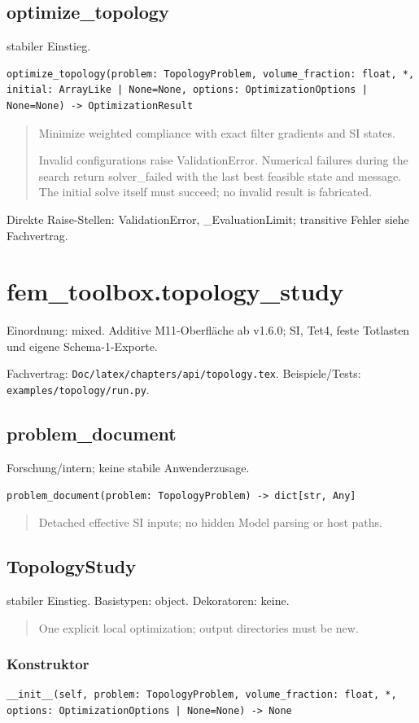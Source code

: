 \subsection{optimize\_topology}
stabiler Einstieg.
\begin{lstlisting}
optimize_topology(problem: TopologyProblem, volume_fraction: float, *, initial: ArrayLike | None=None, options: OptimizationOptions | None=None) -> OptimizationResult
\end{lstlisting}
\begin{quote}
Minimize weighted compliance with exact filter gradients and SI states.\par Invalid configurations raise ValidationError. Numerical failures during the search return solver\_failed with the last best feasible state and message. The initial solve itself must succeed; no invalid result is fabricated.
\end{quote}
Direkte Raise-Stellen: ValidationError, \_EvaluationLimit; transitive Fehler siehe Fachvertrag.
\section{fem\_toolbox.topology\_study}
Einordnung: mixed. Additive M11-Oberfläche ab v1.6.0; SI, Tet4, feste Totlasten und eigene Schema-1-Exporte.
\par Fachvertrag: \nolinkurl{Doc/latex/chapters/api/topology.tex}. Beispiele/Tests:
\nolinkurl{examples/topology/run.py}.
\subsection{problem\_document}
Forschung/intern; keine stabile Anwenderzusage.
\begin{lstlisting}
problem_document(problem: TopologyProblem) -> dict[str, Any]
\end{lstlisting}
\begin{quote}
Detached effective SI inputs; no hidden Model parsing or host paths.
\end{quote}
\subsection{TopologyStudy}
stabiler Einstieg.
Basistypen: object. Dekoratoren: keine.
\begin{quote}
One explicit local optimization; output directories must be new.
\end{quote}
\subsubsection*{Konstruktor}
\begin{lstlisting}
__init__(self, problem: TopologyProblem, volume_fraction: float, *, options: OptimizationOptions | None=None) -> None
\end{lstlisting}
